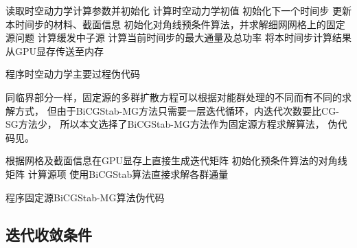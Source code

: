 \begin{algorithm}
读取时空动力学计算参数并初始化\;
计算时空动力学初值
\;
{
  初始化下一个时间步\;
  更新本时间步的材料、截面信息\;
    初始化对角线预条件算法，并求解细网网格上的固定源问题\;
  计算缓发中子源 \algoend
  计算当前时间步的最大通量及总功率\;
  将本时间步计算结果从GPU显存传送至内存\;
}

\caption{\label{alg:program.kinetics.loop}
\ProgramName 程序时空动力学主要过程伪代码}
\end{algorithm}

同临界部分一样，固定源的多群扩散方程可以根据对能群处理的不同而有不同的求解方式，
但由于BiCGStab-MG方法只需要一层迭代循环，内迭代次数要比CG-SG方法少，
所以本文选择了BiCGStab-MG方法作为固定源方程求解算法，
伪代码见。

\begin{comment}

在实际计算中，

\begin{algorithm}
根据网格及截面信息在GPU显存上直接生成各群的迭代矩阵\;
初始化预条件算法的对角线矩阵\;
\Repeat{各群通量收敛}
{
  计算第1群的源项 \algoend
  使用CG算法求解第1群通量\;
  计算第2群的源项 \algoend
  使用CG算法求解第2群通量\;
  估算各群通量的误差\;
}
\setlabelname{\ProgramName 程序固定源CG-SG算法伪代码}
\caption{\label{alg:program.kinetics.cg-sg}
\ProgramName 程序固定源CG-SG算法伪代码}
\end{algorithm}

\end{comment}

\begin{algorithm}
根据网格及截面信息在GPU显存上直接生成迭代矩阵\;
初始化预条件算法的对角线矩阵\;
计算源项\;
使用BiCGStab算法直接求解各群通量\;
\caption{\label{alg:program.kinetics.bicgstab-mg}
\ProgramName 程序固定源BiCGStab-MG算法伪代码}
\end{algorithm}


\subsection{迭代收敛条件}

